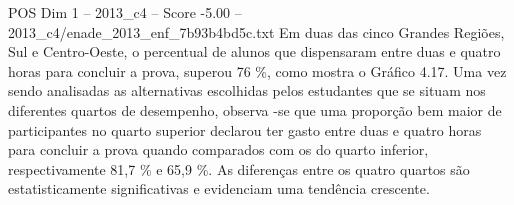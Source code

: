 \begin{textsample}{POS Dim 1 – 2013\_c4 – Score -5.00 – 2013\_c4/enade\_2013\_enf\_7b93b4bd5c.txt}
Em duas das cinco Grandes Regiões, Sul e Centro-Oeste, o percentual de alunos que dispensaram entre duas e quatro horas para concluir a prova, superou 76 \%, como mostra o Gráfico 4.17.
Uma vez sendo analisadas as alternativas escolhidas pelos estudantes que se situam nos diferentes quartos de desempenho, observa -se que uma proporção bem maior de participantes no quarto superior declarou ter gasto entre duas e quatro horas para concluir a prova quando comparados com os do quarto inferior, respectivamente 81,7 \% e 65,9 \%.
As diferenças entre os quatro quartos são estatisticamente significativas e evidenciam uma tendência crescente.

\end{textsample}
